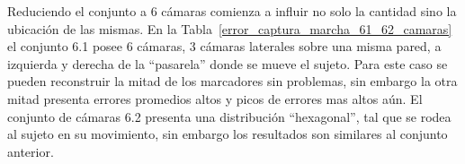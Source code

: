 Reduciendo el conjunto a 6 cámaras comienza a influir no solo la cantidad sino la ubicación de las mismas. En la Tabla~\ref{error_captura_marcha_61_62_camaras} el conjunto 6.1 posee 6 cámaras, 3 cámaras laterales sobre una misma pared, a izquierda y derecha de la ``pasarela'' donde se mueve el sujeto. Para este caso se pueden reconstruir la mitad de los marcadores sin problemas, sin embargo la otra mitad presenta errores promedios altos y picos de errores mas altos aún. El conjunto de cámaras 6.2 presenta una distribución ``hexagonal'', tal que se rodea al sujeto en su movimiento, sin embargo los resultados son similares al conjunto anterior.

\begin{table}[ht!]
\centering
{}
\end{table}
